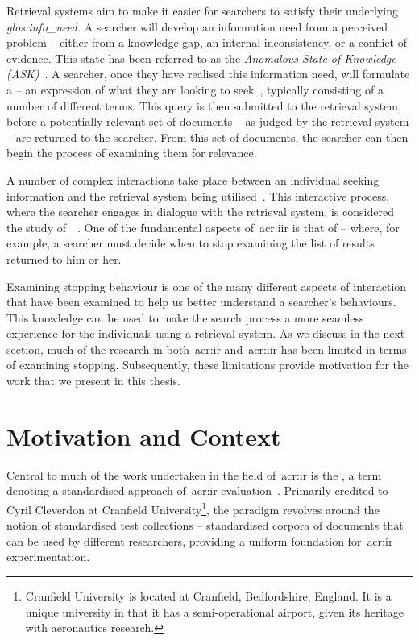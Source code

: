 Retrieval systems aim to make it easier for searchers to satisfy their underlying \emph{\gls{glos:info_need}.} A searcher will develop an information need from a perceived problem -- either from a knowledge gap, an internal inconsistency, or a conflict of evidence. This state has been referred to as the \emph{Anomalous State of Knowledge (ASK)}~\citep{belkin1980ask}. A searcher, once they have realised this information need, will formulate a  -- an expression of what they are looking to seek~\citep{borlund2003iir_model}, typically consisting of a number of different terms. This query is then submitted to the retrieval system, before a potentially relevant set of documents -- as judged by the retrieval system -- are returned to the searcher. From this set of documents, the searcher can then begin the process of examining them for relevance.

A number of complex interactions take place between an individual seeking information and the retrieval system being utilised~\citep{ingwersen2005theturn}. This interactive process, where the searcher engages in dialogue with the retrieval system, is considered the study of~~\citep{borlund2003iir_model}. One of the fundamental aspects of~\gls{acr:iir} is that of  -- where, for example, a searcher must decide when to stop examining the list of results returned to him or her.

Examining stopping behaviour is one of the many different aspects of interaction that have been examined to help us better understand a searcher's behaviours. This knowledge can be used to make the search process a more seamless experience for the individuals using a retrieval system. As we discuss in the next section, much of the research in both~\gls{acr:ir} and~\gls{acr:iir} has been limited in terms of examining stopping. Subsequently, these limitations provide motivation for the work that we present in this thesis.

\section{Motivation and Context}
Central to much of the work undertaken in the field of~\gls{acr:ir} is the , a term denoting a standardised approach of~\gls{acr:ir} evaluation~\citep{aslib1966factors}. Primarily credited to Cyril Cleverdon at Cranfield University\footnote{Cranfield University is located at Cranfield, Bedfordshire, England. It is a unique university in that it has a semi-operational airport, given its heritage with aeronautics research.}, the paradigm revolves around the notion of standardised test collections -- standardised corpora of documents that can be used by different researchers, providing a uniform foundation for~\gls{acr:ir} experimentation.

